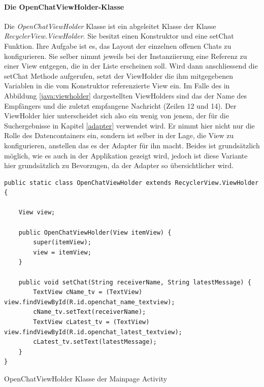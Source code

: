 \documentclass[a4paper,11pt]{report}
\newenvironment{code}{\captionsetup{type=figure}}{}
\begin{document}
			\paragraph{Die OpenChatViewHolder-Klasse}\label{OpenChatViewHolder}
			Die \emph{OpenChatViewHolder} Klasse ist ein abgeleitet Klasse der Klasse \emph{RecyclerView.ViewHolder}. Sie besitzt einen Konstruktor und eine setChat Funktion. Ihre Aufgabe ist es, das Layout der einzelnen offenen Chats zu konfigurieren. Sie selber nimmt jeweils bei der Instanziierung eine Referenz zu einer View entgegen, die in der Liste erscheinen soll. Wird dann anschliessend die setChat Methode aufgerufen, setzt der ViewHolder die ihm mitgegebenen Variablen in die vom Konstruktor referenzierte View ein. Im Falle des in Abbildung \ref{java:viewholder} dargestellten ViewHolders sind das der Name des Empfängers und die zuletzt empfangene Nachricht (Zeilen 12 und 14). Der ViewHolder hier unterscheidet sich also ein wenig von jenem, der für die Suchergebnisse in Kapitel \ref{adapter} verwendet wird. Er nimmt hier nicht nur die Rolle des Datencontainers ein, sondern ist selber in der Lage, die View zu konfigurieren, anstellen das es der Adapter für ihn macht. Beides ist grundsätzlich möglich, wie es auch in der Applikation gezeigt wird, jedoch ist diese Variante hier grundsätzlich zu Bevorzugen, da der Adapter so übersichtlicher wird.
\begin{code}
	\begin{center}
		\begin{verbatim}
public static class OpenChatViewHolder extends RecyclerView.ViewHolder {
		
	View view;
		
	public OpenChatViewHolder(View itemView) {
		super(itemView);
		view = itemView;
	}
		
	public void setChat(String receiverName, String latestMessage) {
		TextView cName_tv = (TextView) view.findViewById(R.id.openchat_name_textview);
		cName_tv.setText(receiverName);
		TextView cLatest_tv = (TextView) view.findViewById(R.id.openchat_latest_textview);
		cLatest_tv.setText(latestMessage);
	}
}
		\end{verbatim}
		\caption{OpenChatViewHolder Klasse der Mainpage Activity}\label{java:viewholder}
	\end{center}
\end{code}			
			
\end{document}
